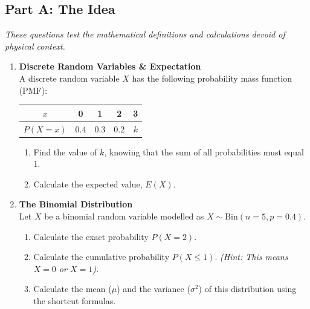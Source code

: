 
\subsection*{Part A: The Idea}
\textit{These questions test the mathematical definitions and calculations devoid of physical context.}

\begin{enumerate}[label=\textbf{Q\arabic*.}, leftmargin=*]
    \item \textbf{Discrete Random Variables \& Expectation} \\
    A discrete random variable $X$ has the following probability mass function (PMF):
    \begin{center}
    \begin{tabular}{|c|c|c|c|c|}
    \hline
    $x$ & 0 & 1 & 2 & 3 \\ \hline
    $P(X=x)$ & $0.4$ & $0.3$ & $0.2$ & $k$ \\ \hline
    \end{tabular}
    \end{center}
    \begin{enumerate}[label=\arabic*.]
        \item Find the value of $k$, knowing that the sum of all probabilities must equal 1.
        \item Calculate the expected value, $E(X)$.
    \end{enumerate}
    \vspace{0.3cm}

    \item \textbf{The Binomial Distribution} \\
    Let $X$ be a binomial random variable modelled as $X \sim \text{Bin}(n=5, p=0.4)$.
    \begin{enumerate}[label=\arabic*.]
        \item Calculate the exact probability $P(X = 2)$.
        \item Calculate the cumulative probability $P(X \leq 1)$. \textit{(Hint: This means $X=0$ or $X=1$).}
        \item Calculate the mean ($\mu$) and the variance ($\sigma^2$) of this distribution using the shortcut formulas.
    \end{enumerate}
    \vspace{0.3cm}


\end{enumerate}
